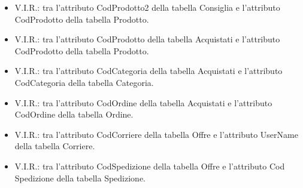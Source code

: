 \begin{itemize}
	\item V.I.R.: tra l’attributo CodProdotto2 della
	tabella Consiglia e l’attributo CodProdotto della tabella Prodotto.
	\item V.I.R.: tra l’attributo CodProdotto della
	tabella Acquistati e l’attributo CodProdotto della tabella Prodotto.
	\item V.I.R.: tra l’attributo CodCategoria della tabella Acquistati e l’attributo CodCategoria della tabella Categoria.
	\item V.I.R.: tra l’attributo CodOrdine della tabella
	Acquistati e l’attributo CodOrdine della tabella Ordine.
	\item V.I.R.: tra l’attributo CodCorriere della
	tabella Offre e l’attributo UserName della
	tabella Corriere.
	\item V.I.R.: tra l’attributo CodSpedizione della tabella Offre e l’attributo Cod Spedizione della tabella Spedizione.
\end{itemize}
\normalsize

